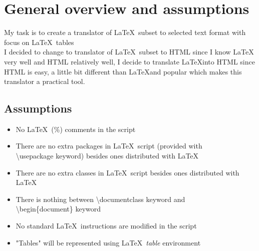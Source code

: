 \section{General overview and assumptions}
My task is to create a translator of \LaTeX \, subset to selected text format with focus on \LaTeX \, tables \\ 
I decided to change to translator of \LaTeX \, subset to HTML since I know \LaTeX \, very well and HTML relatively well, I decide to translate \LaTeX into HTML since HTML is easy, a little bit different than \LaTeX and popular which makes this translator a practical tool.
\subsection{Assumptions}
\begin{itemize}
    \item No \LaTeX \, (\%) comments in the script 
    \item There are no extra packages in \LaTeX \, script (provided with \\ \textbackslash usepackage keyword) besides ones distributed with \LaTeX
    \item There are no extra classes in \LaTeX \, script besides ones distributed with \LaTeX
    \item There is nothing between \textbackslash documentclass keyword and \\ \textbackslash begin\{document\} keyword 
    \item No standard \LaTeX \, instructions are modified in the script
    \item "Tables" will be represented using \LaTeX \, \emph{table} environment 
\end{itemize}
